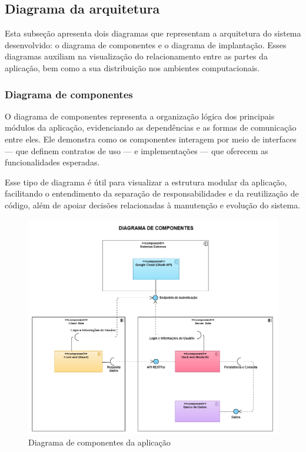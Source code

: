 \subsection{Diagrama da arquitetura}

Esta subseção apresenta dois diagramas que representam a arquitetura do sistema desenvolvido: o diagrama de componentes e o diagrama de implantação. Esses diagramas auxiliam na visualização do relacionamento entre as partes da aplicação, bem como a sua distribuição nos ambientes computacionais.

\subsubsection{Diagrama de componentes}

O diagrama de componentes representa a organização lógica dos principais módulos da aplicação, evidenciando as dependências e as formas de comunicação entre eles. Ele demonstra como os componentes interagem por meio de interfaces — que definem contratos de uso — e implementações — que oferecem as funcionalidades esperadas.

Esse tipo de diagrama é útil para visualizar a estrutura modular da aplicação, facilitando o entendimento da separação de responsabilidades e da reutilização de código, além de apoiar decisões relacionadas à manutenção e evolução do sistema.

\begin{figure}[htb]
  \centering
  \includegraphics[width=\textwidth]{cap04-desenvolvimento/images/4-3-2-1-diagrama-componentes}
  \caption{Diagrama de componentes da aplicação}
  \label{fig:diagrama-componente}
\end{figure}


